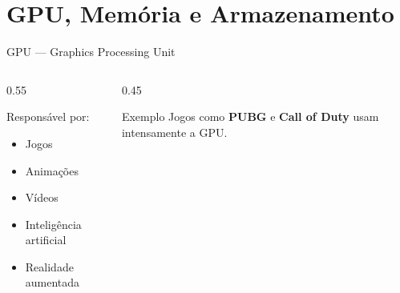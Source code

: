 \documentclass[aspectratio=169]{beamer}
\begin{document}
\section{GPU, Memória e Armazenamento}

\begin{frame}{GPU — Graphics Processing Unit}
    \begin{columns}[T]
        \begin{column}{0.55\textwidth}
            \begin{block}{Responsável por:}
                \begin{itemize}
                    \item Jogos
                    \item Animações
                    \item Vídeos
                    \item Inteligência artificial
                    \item Realidade aumentada
                \end{itemize}
            \end{block}
        \end{column}
        \begin{column}{0.45\textwidth}
            \begin{exampleblock}{Exemplo}
                Jogos como \textbf{PUBG} e \textbf{Call of Duty} usam intensamente a GPU.
            \end{exampleblock}
        \end{column}
    \end{columns}
\end{frame}
\end{document}
